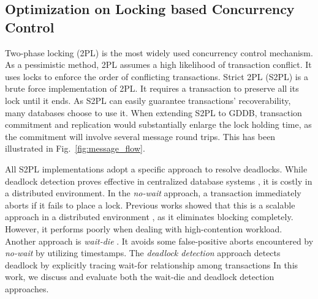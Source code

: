 \documentclass[conference]{IEEEtran}
\begin{document}
\subsection{Optimization on Locking based Concurrency Control}
Two-phase locking (2PL) is the most widely used concurrency control mechanism.
As a pessimistic method, 2PL assumes a high likelihood of transaction conflict.
It uses locks to enforce the order of conflicting transactions.
Strict 2PL (S2PL) is a brute force implementation of 2PL.
It requires a transaction to preserve all its lock until it ends.
As S2PL can easily guarantee transactions' recoverability, many databases choose to use it.
When extending S2PL to GDDB, transaction commitment and replication would substantially enlarge the lock holding time,
as the commitment will involve several message round trips. This has been illustrated in Fig.~\ref{fig:message_flow}.

All S2PL implementations adopt a specific approach to resolve deadlocks.
While deadlock detection proves effective in centralized database systems \cite{MySQL}\cite{PostgreSQL}, it is costly in a distributed environment.
In the \emph{no-wait}
\cite{EvaluationOfCC:journals/pvldb/HardingAPS17}
approach, a transaction immediately aborts if it fails to place a lock.
Previous works showed that this is a scalable approach in a distributed environment \cite{EvaluationCC1000Cores:journals/pvldb/YuBPDS14}\cite{EvaluationOfCC:journals/pvldb/HardingAPS17},
as it eliminates blocking completely.
However, it performs poorly when dealing with high-contention workload.
Another approach is \emph{wait-die} \cite{LockNoWait:journals/csur/BernsteinG81}.
It avoids some false-positive aborts encountered by \emph{no-wait} by utilizing timestamps.
The \emph{deadlock detection} approach \cite{LockCC:conf/ds/GrayLPT76} detects deadlock by explicitly tracing wait-for relationship among transactions
In this work, we discuss and evaluate both the wait-die and deadlock detection approaches.
\end{document}
